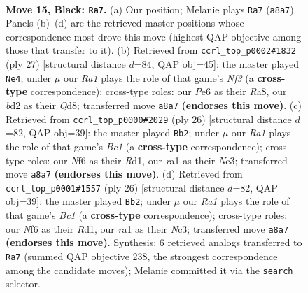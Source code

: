 \documentclass[11pt]{article}
\begin{document}
\clearpage

\begin{figure}[p]\centering
\begin{subfigure}{0.46\textwidth}\centering
\resizebox{\linewidth}{!}{%
\newchessgame
\chessboard[
  setfen={rnr3k1/1p1b1ppp/p1qbpn2/8/8/3BPN2/PP1BNPPP/R2QR1K1 b - - 11 15},
  showmover=false,
  pgfstyle=straightmove, color=movearrow, markmove={a8-a7}
]}
\caption{}
\end{subfigure}\hfill
\begin{subfigure}{0.46\textwidth}\centering
\resizebox{\linewidth}{!}{%
\newchessgame
\chessboard[
  setfen={r2qr1k1/1p3ppp/p1nbbn2/3p4/1P6/P2B1N1P/1BP1NPP1/R2QR1K1 b - - 6 14},
  showmover=false,
  pgfstyle=straightmove, color=movearrow, markmove={f6-e4}
]}
\caption{}
\end{subfigure}
\\[4pt]
\begin{subfigure}{0.46\textwidth}\centering
\resizebox{\linewidth}{!}{%
\newchessgame
\chessboard[
  setfen={rq2k2r/1b1nbppp/pp2pn2/8/1P6/P1NBPN2/4QPPP/R1BR2K1 w kq - 1 14},
  showmover=false,
  pgfstyle=straightmove, color=movearrow, markmove={c1-b2}
]}
\caption{}
\end{subfigure}\hfill
\begin{subfigure}{0.46\textwidth}\centering
\resizebox{\linewidth}{!}{%
\newchessgame
\chessboard[
  setfen={rq2k2r/1b1nbppp/pp2pn2/8/1P6/P1NBPN2/4QPPP/R1BR2K1 w kq - 1 14},
  showmover=false,
  pgfstyle=straightmove, color=movearrow, markmove={c1-b2}
]}
\caption{}
\end{subfigure}
\caption{\textbf{Move 15, Black: \texttt{Ra7}.} (a) Our position; Melanie plays \texttt{Ra7} (\texttt{a8a7}). Panels (b)--(d) are the retrieved master positions whose correspondence most drove this move (highest QAP objective among those that transfer to it). (b) Retrieved from \texttt{ccrl\_top\_p0002\#1832} (ply 27) [structural distance $d$=84, QAP obj=45]: the master played \texttt{Ne4}; under $\mu$ our \emph{Ra1} plays the role of that game's \emph{Nf3} (a \textbf{cross-type} correspondence); cross-type roles: our \emph{P}e6 as their \emph{R}a8, our \emph{b}d2 as their \emph{Q}d8; transferred move \texttt{a8a7} \textbf{(endorses this move)}. (c) Retrieved from \texttt{ccrl\_top\_p0000\#2029} (ply 26) [structural distance $d$=82, QAP obj=39]: the master played \texttt{Bb2}; under $\mu$ our \emph{Ra1} plays the role of that game's \emph{Bc1} (a \textbf{cross-type} correspondence); cross-type roles: our \emph{N}f6 as their \emph{R}d1, our \emph{r}a1 as their \emph{N}c3; transferred move \texttt{a8a7} \textbf{(endorses this move)}. (d) Retrieved from \texttt{ccrl\_top\_p0001\#1557} (ply 26) [structural distance $d$=82, QAP obj=39]: the master played \texttt{Bb2}; under $\mu$ our \emph{Ra1} plays the role of that game's \emph{Bc1} (a \textbf{cross-type} correspondence); cross-type roles: our \emph{N}f6 as their \emph{R}d1, our \emph{r}a1 as their \emph{N}c3; transferred move \texttt{a8a7} \textbf{(endorses this move)}. Synthesis: 6 retrieved analogs transferred to \texttt{Ra7} (summed QAP objective 238, the strongest correspondence among the candidate moves); Melanie committed it via the \texttt{search} selector.}
\label{fig:thought-m29}
\end{figure}
\end{document}
